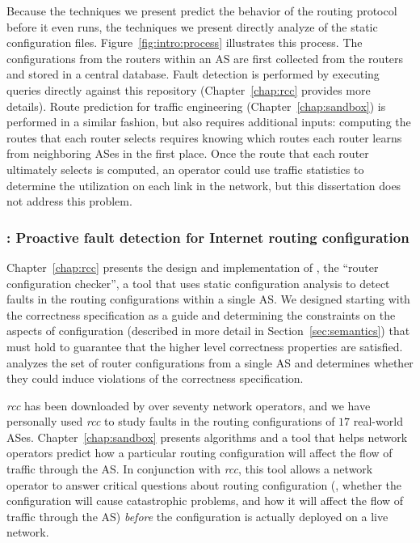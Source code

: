 Because the techniques we present predict the behavior of the routing
protocol before it even runs, the techniques we present directly analyze
of the static configuration files.  Figure~\ref{fig:intro:process}
illustrates this process.  The configurations from the routers within an
AS are first collected from the routers and stored in a central
database.  Fault detection is performed by executing queries directly
against this repository (Chapter~\ref{chap:rcc} provides more details).
Route prediction for traffic engineering (Chapter~\ref{chap:sandbox}) is
performed in a similar fashion, but also requires additional inputs:
computing the routes that each router selects requires knowing which
routes each router learns from neighboring ASes in the first place.
Once the route that each router ultimately selects is computed, an
operator could use traffic statistics to determine the utilization on
each link in the network, but this dissertation does not address this
problem.

\subsubsection{\rccns: Proactive fault detection for Internet routing
configuration}

Chapter~\ref{chap:rcc} presents the design and implementation of \rccns,
the ``router configuration checker'', a tool that uses static 
configuration analysis to detect faults in the routing configurations
within a single AS.  We designed \rcc starting with the correctness
specification as a guide and determining the constraints on the 
aspects of configuration (described in more detail in
Section~\ref{sec:semantics}) that must hold to guarantee that the
higher level correctness properties are satisfied.  \rcc analyzes the
set of router configurations from a single AS and determines whether
they could induce violations of the correctness specification.  

{\em rcc} has been downloaded by over seventy network operators, and we
have personally used {\em rcc} to study faults in the
routing configurations of $17$ real-world ASes.
Chapter~\ref{chap:sandbox} presents algorithms and a tool that helps
network operators predict how a particular routing configuration will
affect the flow of traffic through the AS.  In conjunction with
{\em rcc}, this tool allows a network operator to answer critical
questions about routing configuration (\ie, whether the configuration
will cause catastrophic problems, and how it will affect the flow of
traffic through the AS) {\em before} the configuration is actually
deployed on a live network.

